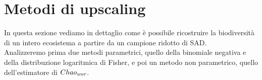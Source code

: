 \chapter{Metodi di upscaling}
In questa sezione vediamo in dettaglio come è possibile ricostruire la biodiversità di un intero ecosistema a partire da un campione ridotto di SAD. \\
Analizzeremo prima due metodi parametrici, quello della binomiale negativa e della distribuzione logaritmica di Fisher, e poi un metodo non parametrico, quello dell'estimatore di $Chao_\emph{wor}$.


\\
